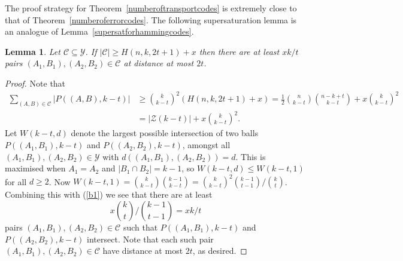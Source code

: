 \documentclass[11pt]{article}
\newtheorem{lemma}[theorem]{Lemma}
\numberwithin{equation}{section}
\begin{document}
The proof strategy for Theorem~\ref{numberoftransportcodes} is extremely close to that of Theorem~\ref{numberoferrorcodes}. The following supersaturation lemma is an analogue of Lemma~\ref{supersatforhammingcodes}.
\begin{lemma}\label{t1} Let $\mathcal C \subseteq \mathcal{Y}$. If 
 $|\mathcal C|\geq H(n,k,2t+1)+x$ then there are at least $xk/t$ pairs $ (A_1,B_1),  (A_2,B_2)\in \mathcal C$ at distance at most $2t$.
\end{lemma}
\begin{proof}
Note that 
\begin{align}\label{b1}
\sum _{(A,B) \in \mathcal C}| P((A,B),k-t)| & \ge \binom{k}{k-t}^2\left(H(n,k,2t+1)+x\right)=\frac12\binom{n}{k-t}\binom{n-k+t}{k-t}+x\binom{k}{k-t}^2 \nonumber\\ & = |\mathcal{Z}(k-t)|+x\binom{k}{k-t}^2. 
\end{align}
Let $W(k-t,d)$ denote the largest possible intersection of two balls $P( (A_1,B_1),k-t)$ and $P( (A_2,B_2),k-t)$, amongst all $ (A_1,B_1),  (A_2,B_2)\in \mathcal Y$ with $d((A_1,B_1),(A_2,B_2))=d$. This is maximised when  
$A_1=A_2$ and $|B_1\cap B_2 |=k-1$, so $W(k-t,d)\leq W(k-t,1)$ for all $d\geq 2$. Now $W(k-t,1)=\binom{k}{k-t}\binom{k-1}{k-t}=\binom{k}{k-t}^2 \binom{k-1}{t-1}/\binom{k}{t}$.  Combining this with (\ref{b1}) we see that there are  at least
 $$ x{\binom{k}{t}}/{\binom{k-1}{t-1}}=x{k}/{t}$$ 
pairs $ (A_1,B_1),  (A_2,B_2)\in \mathcal C$ such that $P((A_1,B_1),k-t)$ and $P((A_2,B_2),k-t)$ intersect. Note that each such pair $ (A_1,B_1),  (A_2,B_2)\in \mathcal C$ have distance at most $2t$, as desired.
\end{proof}

    
\end{document}
